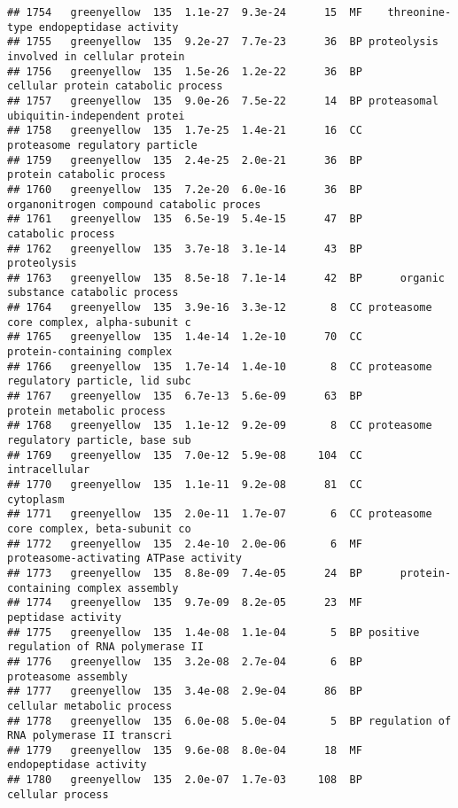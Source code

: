 \documentclass[]{article}
\begin{document}
\begin{verbatim}
## 1754   greenyellow  135  1.1e-27  9.3e-24      15  MF    threonine-type endopeptidase activity
## 1755   greenyellow  135  9.2e-27  7.7e-23      36  BP proteolysis involved in cellular protein
## 1756   greenyellow  135  1.5e-26  1.2e-22      36  BP       cellular protein catabolic process
## 1757   greenyellow  135  9.0e-26  7.5e-22      14  BP proteasomal ubiquitin-independent protei
## 1758   greenyellow  135  1.7e-25  1.4e-21      16  CC           proteasome regulatory particle
## 1759   greenyellow  135  2.4e-25  2.0e-21      36  BP                protein catabolic process
## 1760   greenyellow  135  7.2e-20  6.0e-16      36  BP organonitrogen compound catabolic proces
## 1761   greenyellow  135  6.5e-19  5.4e-15      47  BP                        catabolic process
## 1762   greenyellow  135  3.7e-18  3.1e-14      43  BP                              proteolysis
## 1763   greenyellow  135  8.5e-18  7.1e-14      42  BP      organic substance catabolic process
## 1764   greenyellow  135  3.9e-16  3.3e-12       8  CC proteasome core complex, alpha-subunit c
## 1765   greenyellow  135  1.4e-14  1.2e-10      70  CC               protein-containing complex
## 1766   greenyellow  135  1.7e-14  1.4e-10       8  CC proteasome regulatory particle, lid subc
## 1767   greenyellow  135  6.7e-13  5.6e-09      63  BP                protein metabolic process
## 1768   greenyellow  135  1.1e-12  9.2e-09       8  CC proteasome regulatory particle, base sub
## 1769   greenyellow  135  7.0e-12  5.9e-08     104  CC                            intracellular
## 1770   greenyellow  135  1.1e-11  9.2e-08      81  CC                                cytoplasm
## 1771   greenyellow  135  2.0e-11  1.7e-07       6  CC proteasome core complex, beta-subunit co
## 1772   greenyellow  135  2.4e-10  2.0e-06       6  MF    proteasome-activating ATPase activity
## 1773   greenyellow  135  8.8e-09  7.4e-05      24  BP      protein-containing complex assembly
## 1774   greenyellow  135  9.7e-09  8.2e-05      23  MF                       peptidase activity
## 1775   greenyellow  135  1.4e-08  1.1e-04       5  BP positive regulation of RNA polymerase II
## 1776   greenyellow  135  3.2e-08  2.7e-04       6  BP                      proteasome assembly
## 1777   greenyellow  135  3.4e-08  2.9e-04      86  BP               cellular metabolic process
## 1778   greenyellow  135  6.0e-08  5.0e-04       5  BP regulation of RNA polymerase II transcri
## 1779   greenyellow  135  9.6e-08  8.0e-04      18  MF                   endopeptidase activity
## 1780   greenyellow  135  2.0e-07  1.7e-03     108  BP                         cellular process

\end{verbatim}
\end{document}
